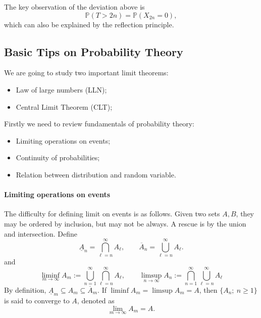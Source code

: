 The key observation of the deviation above is 
\[
\mathbb{P}(T>2n) = \mathbb{P}(X_{2n}=0),
\]
which can also be explained by the reflection principle.


\subsection{Basic Tips on Probability Theory}
We are going to study two important limit theorems:
\begin{itemize}
\item
Law of large numbers (LLN);
\item
Central Limit Theorem (CLT);
\end{itemize}
Firstly we need to review fundamentals of probability theory:
\begin{itemize}
\item
Limiting operations on events;
\item
Continuity of probabilities;
\item
Relation between distribution and random variable.
\end{itemize}
\paragraph{Limiting operations on events}
The difficulty for defining limit on events is as follows.
Given two sets $A,B$, they may be ordered by inclusion, but may not be always.
A rescue is by the union and intersection.
Define
\[
\underline{A}_n = \bigcap_{\ell=n}^{\infty}A_{\ell},\qquad
\overline{A}_n = \bigcup_{\ell=n}^{\infty}A_{\ell}.
\]
and
\[
\liminf_{m\to\infty}A_m:=\bigcup_{n=1}^\infty\bigcap_{\ell=n}^{\infty}A_{\ell},\qquad
\limsup_{n\to\infty}A_n:=\bigcap_{n=1}^\infty\bigcup_{\ell=n}^{\infty}A_{\ell}
\]
By definition, $\underline{A}_m\subseteq
A_m\subseteq
\overline{A}_m$.
If $\liminf A_m=\limsup A_m = A$, then $\{A_n;~n\ge1\}$ is said to converge to $A$, denoted as
\[
\lim_{m\to\infty}A_m=A.
\]

